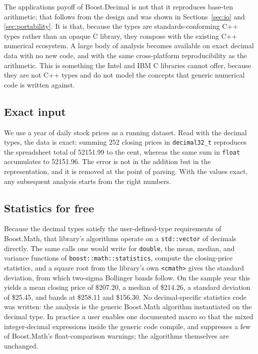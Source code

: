 \documentclass[acmsmall]{acmart}
\begin{document}
The applications payoff of Boost.Decimal is not that it reproduces base-ten arithmetic;
that follows from the design and was shown in Sections~\ref{sec:io} and
\ref{sec:portability}. It is that, because the types are standards-conforming C++ types
rather than an opaque C library, they compose with the existing C++ numerical ecosystem. A
large body of analysis becomes available on exact decimal data with no new code, and with
the same cross-platform reproducibility as the arithmetic. This is something the Intel and
IBM C libraries cannot offer, because they are not C++ types and do not model the concepts
that generic numerical code is written against.

\subsection{Exact input}
We use a year of daily stock prices as a running dataset. Read with the decimal types, the
data is exact: summing 252 closing prices in \texttt{decimal32\_t} reproduces the
spreadsheet total of 52151.99 to the cent, whereas the same sum in \texttt{float}
accumulates to 52151.96. The error is not in the addition but in the representation, and it
is removed at the point of parsing. With the values exact, any subsequent analysis starts
from the right numbers.

\subsection{Statistics for free}
Because the decimal types satisfy the user-defined-type requirements of Boost.Math, that
library's algorithms operate on a \texttt{std::vector} of decimals directly. The same calls
one would write for \texttt{double}, the mean, median, and variance functions of
\texttt{boost::math::statistics}, compute the closing-price statistics, and a square root
from the library's own \texttt{<cmath>} gives the standard deviation, from which two-sigma
Bollinger bands follow. On the sample year this yields a mean closing price of \$207.20, a
median of \$214.26, a standard deviation of \$25.45, and bands at \$258.11 and \$156.30. No
decimal-specific statistics code was written: the analysis is the generic Boost.Math
algorithm instantiated on the decimal type. In practice a user enables one documented macro
so that the mixed integer-decimal expressions inside the generic code compile, and
suppresses a few of Boost.Math's float-comparison warnings; the algorithms themselves are
unchanged.
\end{document}
